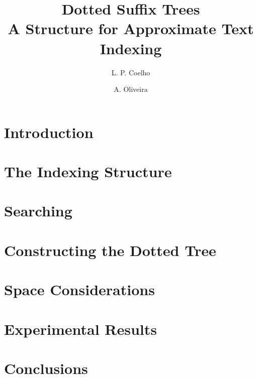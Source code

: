 \documentclass[a4paper,10pt]{article}
\title{Dotted Suffix Trees\\A Structure for Approximate Text Indexing}
\author{L. P. Coelho \and A. Oliveira}
\begin{document}
\maketitle

\begin{abstract}

\end{abstract}

\section{Introduction}\label{sec:introduction}


\section{The Indexing Structure}\label{sec:structure}


\section{Searching}\label{sec:search}


\section{Constructing the Dotted Tree}\label{sec:construction}


\section{Space Considerations}\label{sec:space}


\section{Experimental Results}\label{sec:experimental}


\section{Conclusions}\label{sec:conclusion}




\end{document}
